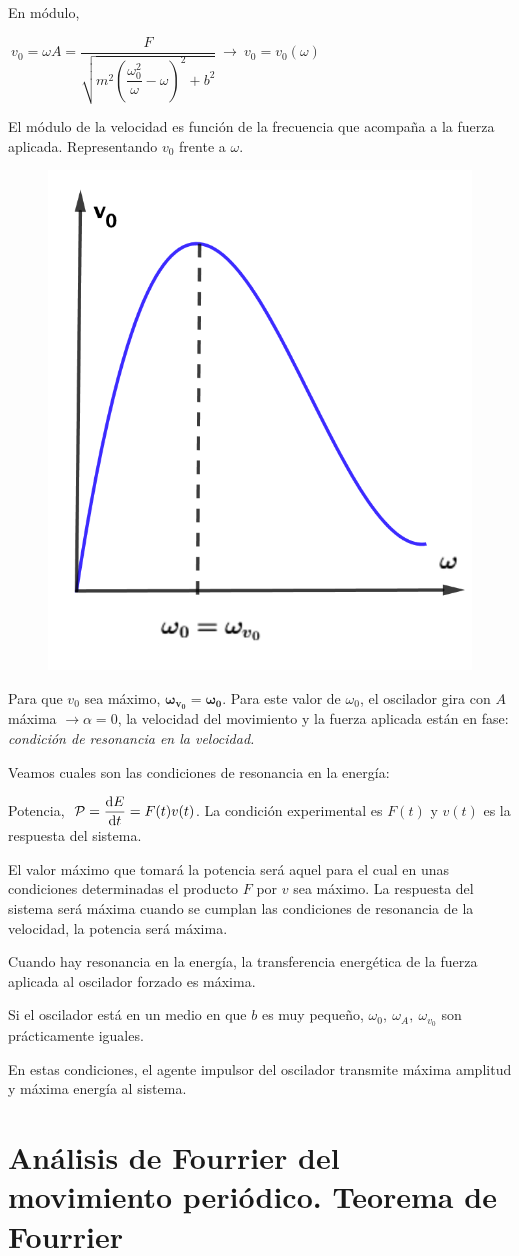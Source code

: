 \vspace{30mm} %
\begin{multicols}{2}
En módulo, 

$\ v_0=\omega A=\dfrac{F}{\sqrt{m^2 \left( \dfrac{\omega_0^2}{\omega}-\omega \right)^2+b^2}} \ \to \ v_0=v_0(\omega)$

El módulo de la velocidad es función de la frecuencia que acompaña a la fuerza aplicada. Representando $v_0$ frente a $\omega$.

\begin{figure}[H]
		\centering
		\includegraphics[width=.25\textwidth]{imagenes/imagenes20/T20IM09.png}
	\end{figure}	
\end{multicols}
Para que $v_0$ sea máximo, $\boldsymbol{ \omega_{v_0}=\omega_0 }$. Para este valor de $\omega_0$, el oscilador gira con $A$ máxima $\to \alpha=0$, la velocidad del movimiento y la fuerza aplicada están en fase: \emph{condición de resonancia en la velocidad.}

Veamos cuales son las condiciones de resonancia en la energía:

Potencia, $\ \mathcal P=\displaystyle \dv{E}{t}=F(t)v(t)$. La condición experimental es $F(t)$ y $v(t)$ es la respuesta del sistema.

El valor máximo que tomará la potencia será aquel para el cual en unas condiciones determinadas el producto $F$ por $v$ sea máximo. La respuesta del sistema será máxima cuando se cumplan las condiciones de resonancia de la velocidad, la potencia será máxima.

Cuando hay resonancia en la energía, la transferencia energética de la fuerza aplicada al oscilador forzado es máxima.

Si el oscilador está en un medio en que $b$ es muy pequeño, $\omega_0, \ \omega_A, \ \omega_{v_0}$ son prácticamente iguales.

En estas condiciones, el agente impulsor del oscilador transmite máxima amplitud y máxima energía al sistema.


\section[Análisis de Fourrier del movimiento periódico. Teorema de Fourrier]{Análisis de Fourrier del movimiento periódico. Teorema de Fourrier}

